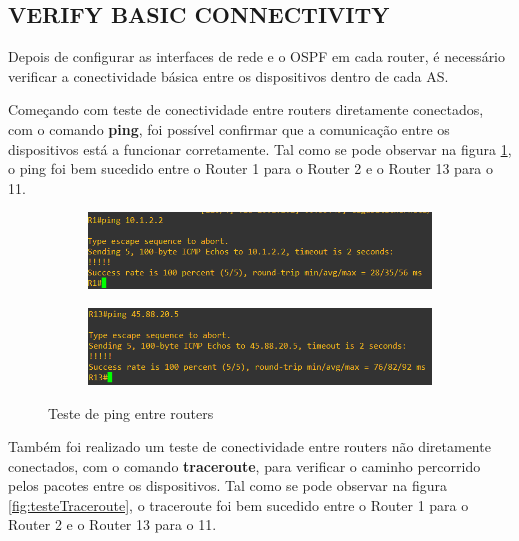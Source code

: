 \documentclass[11pt,english, openright, oneside]{book}
\begin{document}
\subsection{VERIFY BASIC CONNECTIVITY}
\vspace{0.2cm}

Depois de configurar as interfaces de rede e o OSPF em cada router, é necessário verificar a conectividade básica entre os dispositivos dentro de cada AS.
\vspace{0.2cm}

Começando com teste de conectividade entre routers diretamente conectados, com o comando \textbf{ping}, foi possível confirmar que a comunicação entre os dispositivos está a funcionar corretamente. Tal como se pode observar na figura \ref{fig:testePing}, o ping foi bem sucedido entre o Router 1 para o Router 2 e o Router 13 para o 11.
\vspace{0.2cm}

\begin{figure}[h]
  \centering
  \begin{subfigure}{.5\textwidth}
      \centering
      \includegraphics[width=0.99\linewidth]{imagens/Tarefa1/2.pingR1_R2.png}
  \end{subfigure}%
  \begin{subfigure}{.5\textwidth}
      \centering
      \includegraphics[width=0.99\linewidth]{imagens/Tarefa1/2.pingR13_R11.png}
  \end{subfigure}
  \caption{Teste de ping entre routers}
  \label{fig:testePing}
\end{figure}
\vspace{0.2cm}

\newpage
Também foi realizado um teste de conectividade entre routers não diretamente conectados, com o comando \textbf{traceroute}, para verificar o caminho percorrido pelos pacotes entre os dispositivos. Tal como se pode observar na figura \ref{fig:testeTraceroute}, o traceroute foi bem sucedido entre o Router 1 para o Router 2 e o Router 13 para o 11.
\vspace{0.2cm}
\end{document}

